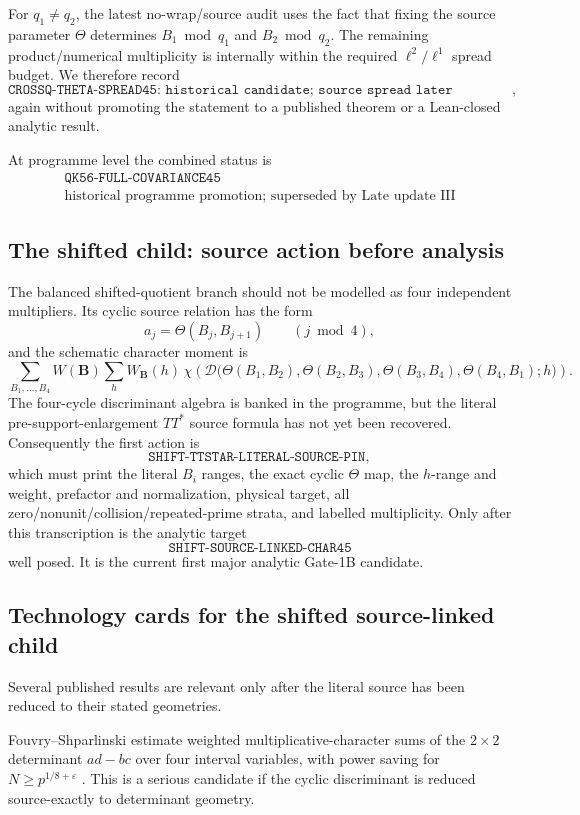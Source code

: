 \documentclass[11pt]{article}
\theoremstyle{definition}
\newcommand{\1}{\mathbf 1}
\begin{document}
For $q_1\ne q_2$, the latest no-wrap/source audit uses the fact that fixing the
source parameter $\Theta$ determines $B_1\bmod q_1$ and $B_2\bmod q_2$.
The remaining product/numerical multiplicity is internally within the required
$\ell^2/\ell^1$ spread budget.  We therefore record
\[
 \boxed{\texttt{CROSSQ-THETA-SPREAD45: historical candidate; source spread later reopened}},
\]
again without promoting the statement to a published theorem or a Lean-closed
analytic result.

At programme level the combined status is
\[
 \boxed{\begin{gathered}
   \texttt{QK56-FULL-COVARIANCE45}\\
   \text{historical programme promotion; superseded by Late update III}
 \end{gathered}}
\]

\subsection{The shifted child: source action before analysis}
The balanced shifted-quotient branch should not be modelled as four independent
multipliers.  Its cyclic source relation has the form
\[
    a_j=\Theta(B_j,B_{j+1})\qquad(j\bmod4),
\]
and the schematic character moment is
\[
 \sum_{B_1,\ldots,B_4} W(\mathbf B)
 \sum_h W_{\mathbf B}(h)\,
 \chi\!\left(
   \mathscr D\bigl(
      \Theta(B_1,B_2),\Theta(B_2,B_3),
      \Theta(B_3,B_4),\Theta(B_4,B_1);h
   \bigr)
 \right).
\]
The four-cycle discriminant algebra is banked in the programme, but the literal
pre-support-enlargement $TT^*$ source formula has not yet been recovered.
Consequently the first action is
\[
 \boxed{\texttt{SHIFT-TTSTAR-LITERAL-SOURCE-PIN}},
\]
which must print the literal $B_i$ ranges, the exact cyclic $\Theta$ map, the
$h$-range and weight, prefactor and normalization, physical target, all
zero/nonunit/collision/repeated-prime strata, and labelled multiplicity.
Only after this transcription is the analytic target
\[
 \boxed{\texttt{SHIFT-SOURCE-LINKED-CHAR45}}
\]
well posed.  It is the current first major analytic Gate-1B candidate.

\subsection{Technology cards for the shifted source-linked child}
Several published results are relevant only after the literal source has been
reduced to their stated geometries.

Fouvry--Shparlinski estimate weighted multiplicative-character sums of the
$2\times2$ determinant $ad-bc$ over four interval variables, with power saving
for $N\ge p^{1/8+\varepsilon}$ \cite{FouvryShparlinski2022}.  This is a serious
candidate if the cyclic discriminant is reduced source-exactly to determinant
geometry.
\end{document}
